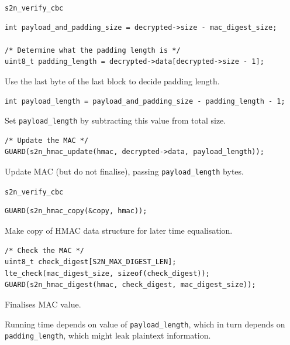 \documentclass[presentation,smaller]{beamer}
\begin{document}
\begin{frame}[fragile,label={sec:orgheadline9}]{\texttt{s2n\_verify\_cbc}}
 \lstset{language=C,label= ,caption= ,captionpos=b,numbers=none}
\begin{lstlisting}
int payload_and_padding_size = decrypted->size - mac_digest_size;

/* Determine what the padding length is */
uint8_t padding_length = decrypted->data[decrypted->size - 1];
\end{lstlisting}

\footnotesize Use the last byte of the last block to decide padding length.

\lstset{language=C,label= ,caption= ,captionpos=b,numbers=none}
\begin{lstlisting}
int payload_length = payload_and_padding_size - padding_length - 1;
\end{lstlisting}

Set \texttt{payload\_length} by subtracting this value from total size.

\lstset{language=C,label= ,caption= ,captionpos=b,numbers=none}
\begin{lstlisting}
/* Update the MAC */
GUARD(s2n_hmac_update(hmac, decrypted->data, payload_length));
\end{lstlisting}

Update MAC (but do not finalise), passing \texttt{payload\_length} bytes.
\end{frame}

\begin{frame}[fragile,label={sec:orgheadline10}]{\texttt{s2n\_verify\_cbc}}
 \lstset{language=C,label= ,caption= ,captionpos=b,numbers=none}
\begin{lstlisting}
GUARD(s2n_hmac_copy(&copy, hmac));
\end{lstlisting}

\footnotesize Make copy of HMAC data structure for later time equalisation.

\lstset{language=C,label= ,caption= ,captionpos=b,numbers=none}
\begin{lstlisting}
/* Check the MAC */
uint8_t check_digest[S2N_MAX_DIGEST_LEN];
lte_check(mac_digest_size, sizeof(check_digest));
GUARD(s2n_hmac_digest(hmac, check_digest, mac_digest_size));
\end{lstlisting}

Finalises MAC value.

Running time depends on value of \texttt{payload\_length}, which in turn depends on \texttt{padding\_length}, which \alert{might} leak plaintext information.
\end{frame}
\end{document}

